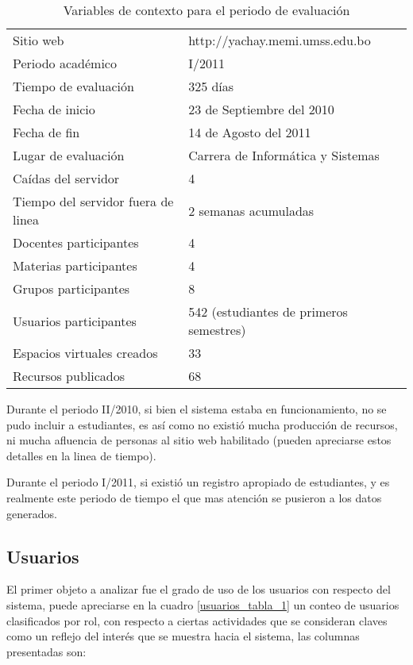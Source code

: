 \begin{table}
\centering
\begin{tabular}{|l|l|}
\hline
Sitio web                          & http://yachay.memi.umss.edu.bo \\
Periodo académico                  & I/2011 \\
Tiempo de evaluación               & 325 días \\
Fecha de inicio                    & 23 de Septiembre del 2010 \\
Fecha de fin                       & 14 de Agosto del 2011 \\
Lugar de evaluación                & Carrera de Informática y Sistemas \\
Caídas del servidor                & 4 \\
Tiempo del servidor fuera de linea & 2 semanas acumuladas \\
Docentes participantes             & 4 \\
Materias participantes             & 4 \\
Grupos participantes               & 8 \\
Usuarios participantes             & 542 (estudiantes de primeros semestres) \\
Espacios virtuales creados         & 33 \\
Recursos publicados                & 68 \\
\hline
\end{tabular}
\caption{Variables de contexto para el periodo de evaluación}
\label{contexto}
\end{table}

Durante el periodo II/2010, si bien el sistema estaba en funcionamiento, no se
pudo incluir a estudiantes, es así como no existió mucha producción de recursos,
ni mucha afluencia de personas al sitio web habilitado (pueden apreciarse estos
detalles en la linea de tiempo).

Durante el periodo I/2011, si existió un registro apropiado de estudiantes, y es
realmente este periodo de tiempo el que mas atención se pusieron a los datos
generados.

\subsection{Usuarios}
El primer objeto a analizar fue el grado de uso de los usuarios con respecto del
sistema, puede apreciarse en la cuadro \ref{usuarios_tabla_1} un conteo de
usuarios clasificados por rol, con respecto a ciertas actividades que se consideran claves como un reflejo del interés que se muestra hacia el sistema, las
columnas presentadas son:


